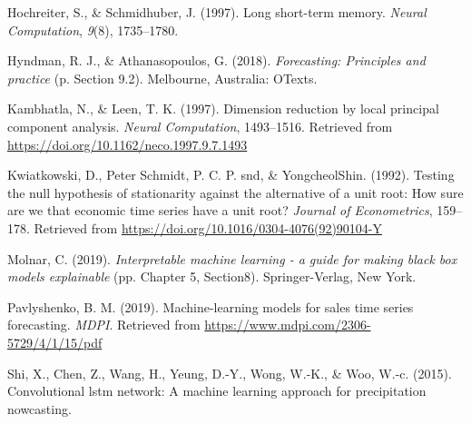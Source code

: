 \documentclass[12pt,oneside]{chicagocapstone}
\begin{document}
\leavevmode\hypertarget{ref-hochreiter1997}{}%
Hochreiter, S., \& Schmidhuber, J. (1997). Long short-term memory. \emph{Neural Computation}, \emph{9}(8), 1735--1780.

\leavevmode\hypertarget{ref-hyndman2018}{}%
Hyndman, R. J., \& Athanasopoulos, G. (2018). \emph{Forecasting: Principles and practice} (p. Section 9.2). Melbourne, Australia: OTexts.

\leavevmode\hypertarget{ref-kambhatla1997}{}%
Kambhatla, N., \& Leen, T. K. (1997). Dimension reduction by local principal component analysis. \emph{Neural Computation}, 1493--1516. Retrieved from \href{https://doi.org/10.1162/neco.1997.9.7.1493\%20}{https://doi.org/10.1162/neco.1997.9.7.1493 }

\leavevmode\hypertarget{ref-kwiatkowski1992}{}%
Kwiatkowski, D., Peter Schmidt, P. C. P. snd, \& YongcheolShin. (1992). Testing the null hypothesis of stationarity against the alternative of a unit root: How sure are we that economic time series have a unit root? \emph{Journal of Econometrics}, 159--178. Retrieved from \url{https://doi.org/10.1016/0304-4076(92)90104-Y}

\leavevmode\hypertarget{ref-molnar2019}{}%
Molnar, C. (2019). \emph{Interpretable machine learning - a guide for making black box models explainable} (pp. Chapter 5, Section8). Springer-Verlag, New York.

\leavevmode\hypertarget{ref-pavlyshenko2019}{}%
Pavlyshenko, B. M. (2019). Machine-learning models for sales time series forecasting. \emph{MDPI}. Retrieved from \url{https://www.mdpi.com/2306-5729/4/1/15/pdf}

\leavevmode\hypertarget{ref-shi2015}{}%
Shi, X., Chen, Z., Wang, H., Yeung, D.-Y., Wong, W.-K., \& Woo, W.-c. (2015). Convolutional lstm network: A machine learning approach for precipitation nowcasting.


\end{document}
